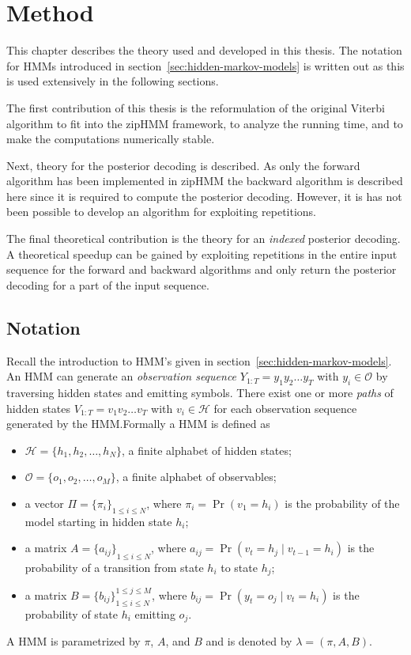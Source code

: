\chapter{Method}
\label{cha:method}

This chapter describes the theory used and developed in this thesis. The
notation for HMMs introduced in section~\ref{sec:hidden-markov-models} is
written out as this is used extensively in the following sections.

The first contribution of this thesis is the reformulation of the original
Viterbi algorithm to fit into the zipHMM framework, to analyze the running
time, and to make the computations numerically stable.

Next, theory for the posterior decoding is described. As only the forward
algorithm has been implemented in zipHMM the backward algorithm is described
here since it is required to compute the posterior decoding. However, it is has
not been possible to develop an algorithm for exploiting repetitions.

The final theoretical contribution is the theory for an \emph{indexed}
posterior decoding. A theoretical speedup can be gained by exploiting
repetitions in the entire input sequence for the forward and backward
algorithms and only return the posterior decoding for a part of the input
sequence.

\section{Notation}

Recall the introduction to HMM's given in
section~\ref{sec:hidden-markov-models}. An HMM can generate an \emph{observation
 sequence} $Y_{1:T} = y_1y_2\dots{}y_T$ with $y_i \in \mathcal{O}$ by
traversing hidden states and emitting symbols. There exist one or more
\emph{paths} of hidden states $V_{1:T} = v_1v_2\dots{}v_T$ with
$v_i \in \mathcal{H}$ for each observation sequence generated by the HMM.\@ Formally
a HMM is defined as
\begin{itemize}
\item $\mathcal{H} = \{h_1, h_2, \dots, h_N\}$, a finite alphabet of hidden
  states;
\item $\mathcal{O} = \{o_1, o_2, \dots, o_M\}$, a finite alphabet of observables;
\item a vector $\Pi = {\{\pi_i\}}_{1 \le i \le N}$, where $\pi_i = \Pr(v_1 =
  h_i)$ is the probability of the model starting in hidden state $h_i$;
\item a matrix $A = {\{a_{ij}\}}_{1 \le i \le N}$, where $a_{ij} = \Pr(v_t
  = h_j \mid v_{t - 1} = h_i)$ is the probability of a transition from state
  $h_i$ to state $h_j$;
\item a matrix $B = {\{b_{ij}\}}_{1 \le i \le N}^{1 \le j \le M}$, where
  $b_{ij} = \Pr(y_t = o_j \mid v_t = h_i)$ is the probability of state
  $h_i$ emitting $o_j$.
\end{itemize}
A HMM is parametrized by $\pi$, $A$, and $B$ and is denoted by $\lambda =
(\pi, A, B)$.

